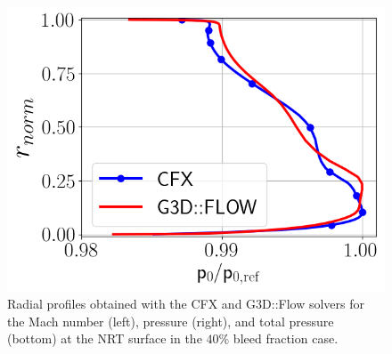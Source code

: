 \begin{figure}[h!]
\begin{minipage}{0.48\columnwidth}
  \end{minipage}
  \begin{minipage}{0.48\columnwidth}
  \includegraphics[width=1.\textwidth]{Figures/P0Mave_NRT.png}
  \end{minipage}
  \caption{Radial profiles obtained with the CFX and G3D::Flow solvers for the Mach number (left), pressure (right), and total pressure (bottom) at the NRT surface in the $40\%$ bleed fraction case.} \label{fig:NRT40}
\end{figure}

